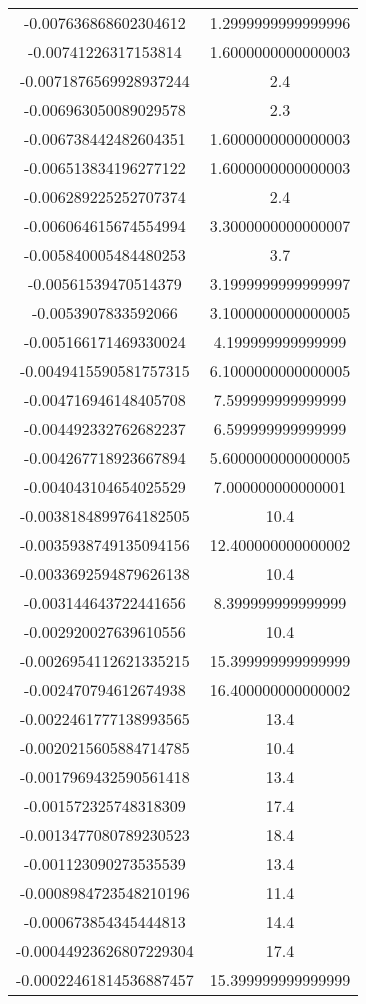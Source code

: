 \begin{table}
\begin{tabular}{S[]S[]}
-0.007636868602304612 & 1.2999999999999996\\
-0.00741226317153814 & 1.6000000000000003\\
-0.0071876569928937244 & 2.4\\
-0.006963050089029578 & 2.3\\
-0.006738442482604351 & 1.6000000000000003\\
-0.006513834196277122 & 1.6000000000000003\\
-0.006289225252707374 & 2.4\\
-0.006064615674554994 & 3.3000000000000007\\
-0.005840005484480253 & 3.7\\
-0.00561539470514379 & 3.1999999999999997\\
-0.0053907833592066 & 3.1000000000000005\\
-0.005166171469330024 & 4.199999999999999\\
-0.0049415590581757315 & 6.1000000000000005\\
-0.004716946148405708 & 7.599999999999999\\
-0.004492332762682237 & 6.599999999999999\\
-0.004267718923667894 & 5.6000000000000005\\
-0.004043104654025529 & 7.000000000000001\\
-0.0038184899764182505 & 10.4\\
-0.0035938749135094156 & 12.400000000000002\\
-0.0033692594879626138 & 10.4\\
-0.003144643722441656 & 8.399999999999999\\
-0.002920027639610556 & 10.4\\
-0.0026954112621335215 & 15.399999999999999\\
-0.002470794612674938 & 16.400000000000002\\
-0.0022461777138993565 & 13.4\\
-0.0020215605884714785 & 10.4\\
-0.0017969432590561418 & 13.4\\
-0.001572325748318309 & 17.4\\
-0.0013477080789230523 & 18.4\\
-0.001123090273535539 & 13.4\\
-0.0008984723548210196 & 11.4\\
-0.000673854345444813 & 14.4\\
-0.00044923626807229304 & 17.4\\
-0.00022461814536887457 & 15.399999999999999\\

\end{tabular}
\end{table}

